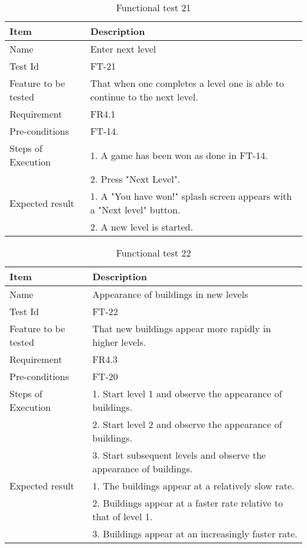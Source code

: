 \begin{table}[H]
\centering
	\begin{tabular}{ l | p{8cm} }
		\hline
		{\bf Item} & {\bf Description} \\ \hline
		Name & Enter next level \\ 
		Test Id & FT-21 \\ 
		Feature to be tested & That when one completes a level one is able to continue to the next level. \\ 
		Requirement & FR4.1 \\ 
		Pre-conditions & FT-14.\\ 
		Steps of Execution & 1. A game has been won as done in FT-14.\\
		& 2. Press "Next Level". \\
		Expected result & 1. A "You have won!" splash screen appears with a "Next level" button. \\
		& 2. A new level is started. \\
	\end{tabular}
	\caption{Functional test 21}
\end{table}

\begin{table}[H]
\centering
	\begin{tabular}{ l | p{8cm} }
		\hline
		{\bf Item} & {\bf Description} \\ \hline
		Name & Appearance of buildings in new levels \\ 
		Test Id & FT-22 \\ 
		Feature to be tested & That new buildings appear more rapidly in higher levels. \\ 
		Requirement & FR4.3 \\ 
		Pre-conditions & FT-20 \\ 
		Steps of Execution & 1. Start level 1 and observe the appearance of buildings. \\ 
		& 2. Start level 2 and observe the appearance of buildings. \\
		& 3. Start subsequent levels and observe the appearance of buildings. \\
		Expected result & 1. The buildings appear at a relatively slow rate. \\
		& 2. Buildings appear at a faster rate relative to that of level 1. \\
		& 3. Buildings appear at an increasingly faster rate. \\
	\end{tabular}
	\caption{Functional test 22}
\end{table}

